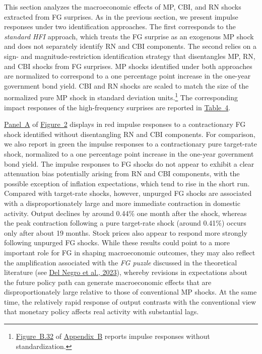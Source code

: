 \documentclass[\latexroot/\projectname]{subfiles}
\begin{document}
This section analyzes the macroeconomic effects of MP, CBI, and RN shocks extracted from FG surprises. As in the previous section, we present impulse responses under two identification approaches. The first corresponds to the \emph{standard HFI} approach, which treats the FG surprise as an exogenous MP shock and does not separately identify RN and CBI components. The second relies on a sign- and magnitude-restriction identification strategy that disentangles MP, RN, and CBI shocks from FG surprises. MP shocks identified under both approaches are normalized to correspond to a one percentage point increase in the one-year government bond yield. CBI and RN shocks are scaled to match the size of the normalized pure MP shock in standard deviation units.\footnote{\hyperlink{Figure B.32}{Figure~B.32} of \hyperlink{Appendix B}{Appendix~B} reports impulse responses without standardization.} The corresponding impact responses of the high-frequency surprises are reported in \hyperlink{Table 4}{Table~4}.







\hyperlink{Panel BF1}{Panel~A} of \hyperlink{Figure~2}{Figure~2} displays in red impulse responses to a contractionary FG shock identified without disentangling RN and CBI components. For comparison, we also report in green the impulse responses to a contractionary pure target-rate shock, normalized to a one percentage point increase in the one-year government bond yield. The impulse responses to FG shocks do not appear to exhibit a clear attenuation bias potentially arising from RN and CBI components, with the possible exception of inflation expectations, which tend to rise in the short run. Compared with target-rate shocks, however, unpurged FG shocks are associated with a disproportionately large and more immediate contraction in domestic activity. Output declines by around 0.44\% one month after the shock, whereas the peak contraction following a pure target-rate shock (around 0.41\%) occurs only after about 19 months. Stock prices also appear to respond  more strongly following unpurged FG shocks. While these results could point to a more important role for FG in shaping macroeconomic outcomes, they may also reflect the amplification associated with the \emph{FG puzzle} discussed in the theoretical literature (see \hyperlink{Del Negro et al. (2023)}{Del Negro et al., 2023}), whereby revisions in expectations about the future policy path can generate macroeconomic effects that are disproportionately large relative to those of conventional MP shocks. At the same time, the relatively rapid response of output contrasts with the conventional view that monetary policy affects real activity with substantial lags.
\end{document}

